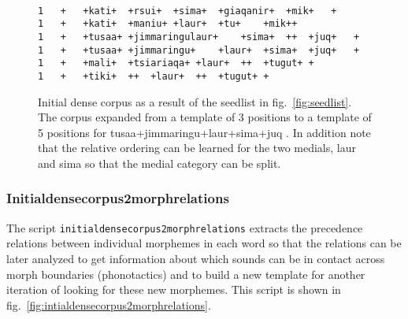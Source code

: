 \documentclass[runningheads,a4paper]{llncs}
\begin{document}
\begin{figure}[htb]{\footnotesize
\begin{verbatim}

1	+	+kati+	+rsui+	+sima+	+giaqanir+	+mik+	+
1	+	+kati+	+maniu+	+laur+	+tu+	+mik++
1	+	+tusaa+	+jimmaringulaur+	+sima+	++	+juq+	+
1	+	+tusaa+	+jimmaringu+	+laur+	+sima+	+juq+	+
1	+	+mali+	+tsiariaqa+	+laur+	++	+tugut+	+
1	+	+tiki+	++	+laur+	++	+tugut+	+
\end{verbatim} }
	\caption{Initial dense corpus as a result of the seedlist in fig.~\ref{fig:seedlist}. The corpus expanded from a template of 3 positions to a template of 5 positions for tusaa+jimmaringu+laur+sima+juq . In addition note that the relative ordering can be learned for the two medials, laur and sima so that the medial category can be split.}
	\label{fig:intialdensecorpus}
\end{figure}




\subsubsection{Initialdensecorpus2morphrelations}

The script {\tt initialdensecorpus2morphrelations} extracts the precedence relations between individual morphemes in each word so that the relations can be later analyzed to get information about which sounds can be in contact across morph boundaries (phonotactics) and to build a new template for another iteration of looking for these new morphemes. This script is shown in fig.~\ref{fig:intialdensecorpus2morphrelations}.
\end{document}
